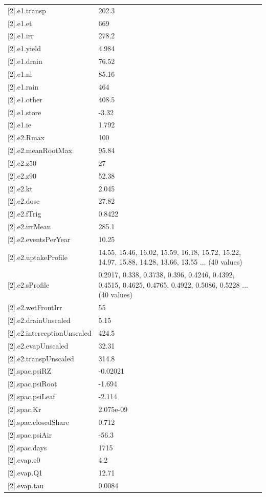 {\begin{longtable}{p{}p{}}
{}[2].e1.transp & 202.3\\
{}[2].e1.et & 669\\
{}[2].e1.irr & 278.2\\
{}[2].e1.yield & 4.984\\
{}[2].e1.drain & 76.52\\
{}[2].e1.nl & 85.16\\
{}[2].e1.rain & 464\\
{}[2].e1.other & 408.5\\
{}[2].e1.store & -3.32\\
{}[2].e1.ie & 1.792\\
{}[2].e2.Rmax & 100\\
{}[2].e2.meanRootMax & 95.84\\
{}[2].e2.z50 & 27\\
{}[2].e2.z90 & 52.38\\
{}[2].e2.kt & 2.045\\
{}[2].e2.dose & 27.82\\
{}[2].e2.fTrig & 0.8422\\
{}[2].e2.irrMean & 285.1\\
{}[2].e2.eventsPerYear & 10.25\\
{}[2].e2.uptakeProfile & 14.55, 15.46, 16.02, 15.59, 16.18, 15.72, 15.22, 14.97, 15.88, 14.28, 13.66, 13.55 ... (40 values)\\
{}[2].e2.sProfile & 0.2917, 0.338, 0.3738, 0.396, 0.4246, 0.4392, 0.4515, 0.4625, 0.4765, 0.4922, 0.5086, 0.5228 ... (40 values)\\
{}[2].e2.wetFrontIrr & 55\\
{}[2].e2.drainUnscaled & 5.15\\
{}[2].e2.interceptionUnscaled & 424.5\\
{}[2].e2.evapUnscaled & 32.31\\
{}[2].e2.transpUnscaled & 314.8\\
{}[2].spac.psiRZ & -0.02021\\
{}[2].spac.psiRoot & -1.694\\
{}[2].spac.psiLeaf & -2.114\\
{}[2].spac.Kr & 2.075e-09\\
{}[2].spac.closedShare & 0.712\\
{}[2].spac.psiAir & -56.3\\
{}[2].spac.days & 1715\\
{}[2].evap.e0 & 4.2\\
{}[2].evap.Q1 & 12.71\\
{}[2].evap.tau & 0.0084\\

\end{longtable}}
